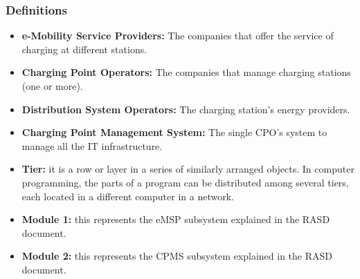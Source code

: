 \subsubsection{Definitions}
\begin{itemize}
    \item \textbf{e-Mobility Service Providers:} The companies that offer the service of charging at different stations.
    \item \textbf{Charging Point Operators:} The companies that manage charging stations (one or more).\label{CPO}
    \item \textbf{Distribution System Operators:} The charging station's energy providers.\label{DSO}
    \item \textbf{Charging Point Management System:} The single CPO's system to manage all the IT infrastructure.
    \item \textbf{Tier:} it is a row or layer in a series of similarly arranged objects. In computer programming, the parts of a program can be distributed among several tiers, each located in a different computer in a network.
    \item \textbf{Module 1:} this represents the eMSP subsystem explained in the RASD document.
    \item \textbf{Module 2:} this represents the CPMS subsystem explained in the RASD document.
\end{itemize}

